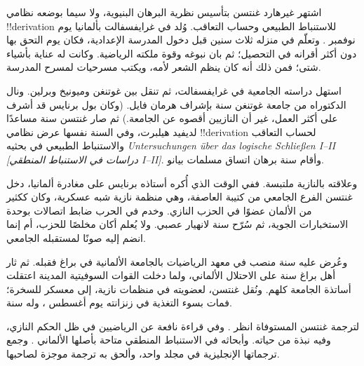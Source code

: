 \documentclass[../../../include/open-logic-section]{subfiles}
\begin{document}



اشتهر غيرهارد غنتسن بتأسيس نظرية البرهان البنيوية، ولا سيما بوضعه نظامي
!!{derivation} للاستنباط الطبيعي وحساب التعاقب. وُلد في غرايفسفالت
بألمانيا يوم  نوفمبر . وتعلّم في منزله ثلاث سنين قبل دخول المدرسة
الإعدادية، فكان يوم التحق بها دون أكثر أقرانه في التحصيل؛ ثم بان نبوغه
وقوة ملكته الرياضية. وكانت له عناية بأشياء شتى؛ فمن ذلك أنه كان ينظم
الشعر لأمه، ويكتب مسرحيات لمسرح المدرسة.

استهل دراسته الجامعية في غرايفسفالت، ثم تنقل بين غوتنغن وميونيخ
وبرلين. ونال الدكتوراه من جامعة غوتنغن سنة  بإشراف هرمان فايل.
(وكان بول برنايس قد أشرف على أكثر العمل، غير أن النازيين أقصوه عن
الجامعة.) ثم صار غنتسن سنة  مساعدًا لديفيد هيلبرت، وفي السنة نفسها
عرض نظامي !!{derivation} لحساب التعاقب والاستنباط الطبيعي في بحثيه
\emph{Untersuchungen \"{u}ber das logische Schlie\ss en I--II
  [دراسات في الاستنباط المنطقي I--II]}. وأقام سنة  برهان اتساق
مسلمات بيانو.

وعلاقته بالنازية ملتبسة. ففي الوقت الذي أُكره أستاذه برنايس على مغادرة
ألمانيا، دخل غنتسن الفرع الجامعي من كتيبة العاصفة، وهي منظمة نازية شبه
عسكرية، وكان ككثير من الألمان عضوًا في الحزب النازي. وخدم في الحرب ضابط
اتصالات بوحدة الاستخبارات الجوية، ثم سُرّح سنة  لانهيار عصبي. ولا
يُعلم أكان مخلصًا للحزب، أم إنما انضم إليه صونًا لمستقبله الجامعي.

وعُرض عليه سنة  منصب في معهد الرياضيات بالجامعة الألمانية في براغ
فقبله. ثم ثار أهل براغ سنة  على الاحتلال الألماني، ولما دخلت القوات
السوفيتية المدينة اعتقلت أساتذة الجامعة كلهم. ونُقل غنتسن، لعضويته في
منظمات نازية، إلى معسكر للسخرة؛ فمات بسوء التغذية في زنزانته يوم 
أغسطس ، وله  سنة.

\begin{reading}
لترجمة غنتسن المستوفاة انظر \citet{Menzler-Trott2007}. وفي
\citet{Segal2014} قراءة نافعة عن الرياضيين في ظل الحكم النازي، وفيه
نبذة من حياته. وأبحاثه في الاستنباط المنطقي متاحة بأصلها الألماني
\citep{Gentzen1935a,Gentzen1935b}. وجمع \citet{Gentzen1969} ترجماتها
الإنجليزية في مجلد واحد، وألحق به ترجمة موجزة لصاحبها.
\end{reading}
\end{document}

